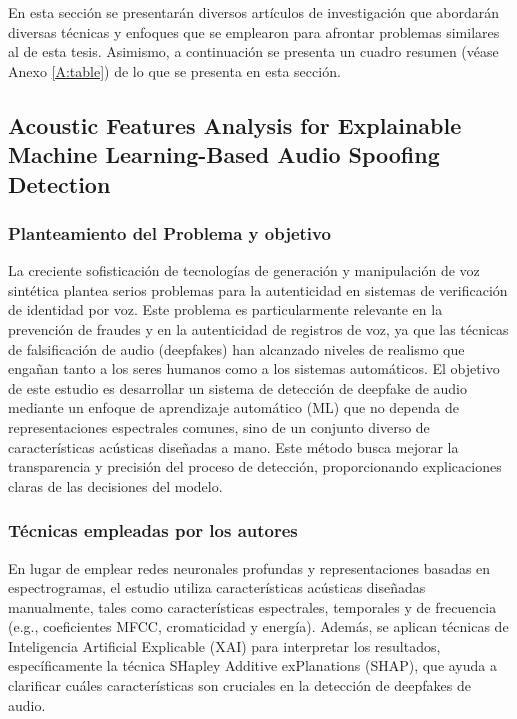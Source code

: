En esta sección se presentarán diversos artículos de investigación que abordarán diversas técnicas y enfoques que se emplearon para afrontar problemas similares al de esta tesis. Asimismo, a continuación se presenta un cuadro resumen (véase Anexo \ref{A:table}) de lo que se presenta en esta sección.


\subsection{Acoustic Features Analysis for Explainable Machine Learning-Based Audio Spoofing Detection \citep*{bisogni2024acoustic}}

\subsubsection{Planteamiento del Problema y objetivo }
La creciente sofisticación de tecnologías de generación y manipulación de voz sintética plantea serios problemas para la autenticidad en sistemas de verificación de identidad por voz. Este problema es particularmente relevante en la prevención de fraudes y en la autenticidad de registros de voz, ya que las técnicas de falsificación de audio (deepfakes) han alcanzado niveles de realismo que engañan tanto a los seres humanos como a los sistemas automáticos. El objetivo de este estudio es desarrollar un sistema de detección de deepfake de audio mediante un enfoque de aprendizaje automático (ML) que no dependa de representaciones espectrales comunes, sino de un conjunto diverso de características acústicas diseñadas a mano. Este método busca mejorar la transparencia y precisión del proceso de detección, proporcionando explicaciones claras de las decisiones del modelo.

\subsubsection{Técnicas empleadas por los autores}
En lugar de emplear redes neuronales profundas y representaciones basadas en espectrogramas, el estudio utiliza características acústicas diseñadas manualmente, tales como características espectrales, temporales y de frecuencia (e.g., coeficientes MFCC, cromaticidad y energía). Además, se aplican técnicas de Inteligencia Artificial Explicable (XAI) para interpretar los resultados, específicamente la técnica SHapley Additive exPlanations (SHAP), que ayuda a clarificar cuáles características son cruciales en la detección de deepfakes de audio. 

